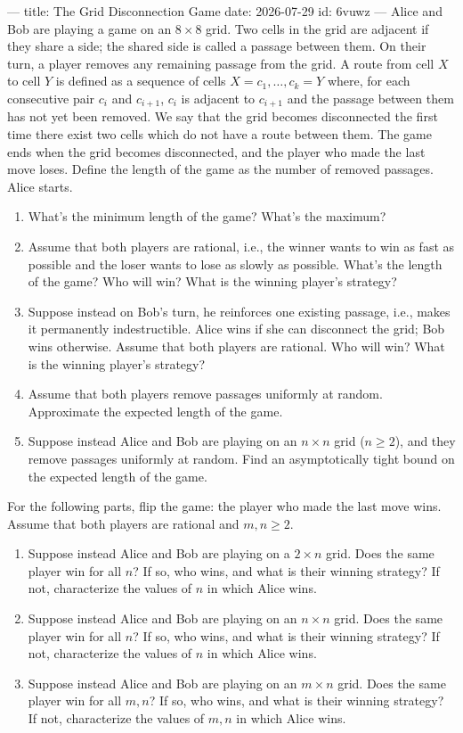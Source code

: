 ---
title: The Grid Disconnection Game
date: 2026-07-29
id: 6vuwz
---
Alice and Bob are playing a game on an $8\times8$ grid. Two cells in the grid are adjacent if they share a side; the shared side is called a passage between them. On their turn, a player removes any remaining passage from the grid. A route from cell $X$ to cell $Y$ is defined as a sequence of cells $X=c_1,\dots,c_k=Y$ where, for each consecutive pair $c_i$ and $c_{i+1}$, $c_i$ is adjacent to $c_{i+1}$ and the passage between them has not yet been removed. We say that the grid becomes disconnected the first time there exist two cells which do not have a route between them. The game ends when the grid becomes disconnected, and the player who made the last move loses. Define the length of the game as the number of removed passages. Alice starts.

\begin{enumerate}
\item[(a)] What's the minimum length of the game? What's the maximum?
\item[(b)] Assume that both players are rational, i.e., the winner wants to win as fast as possible and the loser wants to lose as slowly as possible. What's the length of the game? Who will win? What is the winning player's strategy?
\item[(c)] Suppose instead on Bob's turn, he reinforces one existing passage, i.e., makes it permanently indestructible. Alice wins if she can disconnect the grid; Bob wins otherwise. Assume that both players are rational. Who will win? What is the winning player's strategy?
\item[(d)$^*$] Assume that both players remove passages uniformly at random. Approximate the expected length of the game.
\item[(e)$^*$] Suppose instead Alice and Bob are playing on an $n\times n$ grid ($n\ge2$), and they remove passages uniformly at random. Find an asymptotically tight bound on the expected length of the game.
\end{enumerate}

For the following parts, flip the game: the player who made the last move wins. Assume that both players are rational and $m,n\ge2$.

\begin{enumerate}
\item[(f)] Suppose instead Alice and Bob are playing on a $2\times n$ grid. Does the same player win for all $n$? If so, who wins, and what is their winning strategy? If not, characterize the values of $n$ in which Alice wins.
\item[(g)$^{**}$] Suppose instead Alice and Bob are playing on an $n\times n$ grid. Does the same player win for all $n$? If so, who wins, and what is their winning strategy? If not, characterize the values of $n$ in which Alice wins.
\item[(h)$^{***}$] Suppose instead Alice and Bob are playing on an $m\times n$ grid. Does the same player win for all $m,n$? If so, who wins, and what is their winning strategy? If not, characterize the values of $m,n$ in which Alice wins.
\end{enumerate}

